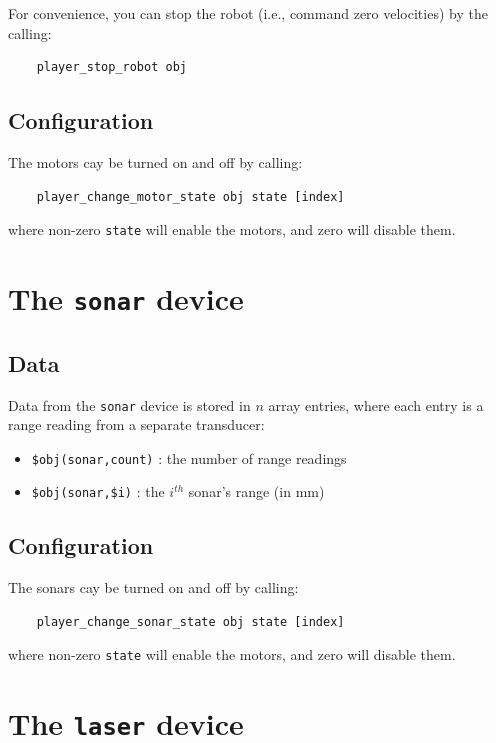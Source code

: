 \documentclass[11pt]{article}
\begin{document}
For convenience, you can stop the robot (i.e., command zero velocities)
by the calling:
\begin{verbatim}
    player_stop_robot obj
\end{verbatim}

\subsection{Configuration}
The motors cay be turned on and off by calling:
\begin{verbatim}
    player_change_motor_state obj state [index]
\end{verbatim}
where non-zero {\tt state} will enable the motors, and zero will disable them.

\section{The {\tt sonar} device}
\subsection{Data}
Data from the {\tt sonar} device is stored in $n$ array 
entries, where each entry is a range reading from a separate transducer:
\begin{itemize}
\item {\tt \$obj(sonar,count)} : the number of range readings
\item {\tt \$obj(sonar,\$i)} : the $i^{th}$ sonar's range (in mm)
\end{itemize}

\subsection{Configuration}
The sonars cay be turned on and off by calling:
\begin{verbatim}
    player_change_sonar_state obj state [index]
\end{verbatim}
where non-zero {\tt state} will enable the motors, and zero will disable them.

\section{The {\tt laser} device}
\end{document}
